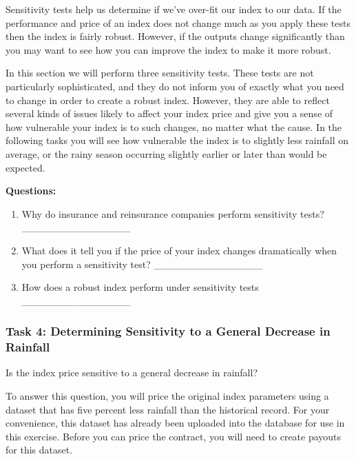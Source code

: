 \documentclass[letterpaper,10pt,english]{sphinxmanual}
\begin{document}
Sensitivity tests help us determine if we've over-fit our index to our data.  If the performance and price of an index does not change much as you apply these tests then the index is fairly robust. However, if the outputs change significantly than you may want to see how you can improve the index to make it more robust.

In this section we will perform three sensitivity tests. These tests are not particularly sophisticated, and they do not inform you of exactly what you need to change in order to create a robust index. However, they are able to reflect several kinds of issues likely to affect your index price and give you a sense of how vulnerable your index is to such changes, no matter what the cause. In the following tasks you will see how vulnerable the index is to slightly less rainfall on average, or the rainy season occurring slightly earlier or later than would be expected.

\textbf{Questions:}
\begin{enumerate}
\item {} 
Why do insurance and reinsurance companies perform sensitivity tests? \_\_\_\_\_\_\_\_\_\_\_\_\_\_\_

\item {} 
What does it tell you if the price of your index changes dramatically when you perform a sensitivity test? \_\_\_\_\_\_\_\_\_\_\_\_\_\_\_

\item {} 
How does a robust index perform under sensitivity tests \_\_\_\_\_\_\_\_\_\_\_\_\_\_\_

\end{enumerate}


\subsubsection{Task 4:  Determining Sensitivity to a General Decrease in Rainfall}
\label{wiiet/wiiet_initialtomarketpricing_Web:task-4-determining-sensitivity-to-a-general-decrease-in-rainfall}
Is the index price sensitive to a general decrease in rainfall?

To answer this question, you will price the original index parameters using a dataset that has five percent less rainfall than the historical record. For your convenience, this dataset has already been uploaded into the database for use in this exercise. Before you can price the contract, you will need to create payouts for this dataset.
\end{document}

